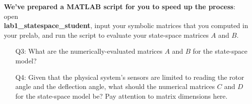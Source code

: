 \documentclass[12pt]{report}
\newcommand\drew[1]{\textcolor{red}{#1}}
\begin{document}
\textbf{We've prepared a MATLAB script for you to speed up the process}: open \\
\textbf{lab1\_statespace\_student}, input your symbolic matrices that you computed in your prelab, and run the script to evaluate your state-space matrices $A$ and $B$.
\begin{enumerate}[Question]
    \item[Q3:] What are the numerically-evaluated matrices $A$ and $B$ for the state-space model?\\
    \item[Q4:] Given that the physical system's sensors are limited to reading the rotor angle and the deflection angle, what should the numerical matrices $C$ and $D$ for the state-space model be? Pay attention to matrix dimensions here.\\
\end{enumerate}
\end{document}
